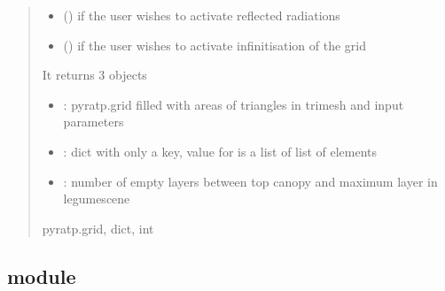\documentclass[letterpaper,10pt,english]{sphinxmanual}
\begin{document}
\begin{fulllineitems}
\begin{quote}
\begin{description}
\begin{itemize}
\item {} 
\sphinxAtStartPar
{} () \textendash{} if the user wishes to activate reflected radiations

\item {} 
\sphinxAtStartPar
{} () \textendash{} if the user wishes to activate infinitisation of the grid

\end{itemize}

\sphinxAtStartPar

\sphinxAtStartPar
It returns 3 objects
\begin{itemize}
\item {} 
\sphinxAtStartPar
{} : pyratp.grid filled with areas of triangles in trimesh and input parameters

\item {} 
\sphinxAtStartPar
{} : dict with only a  key, value for  is a list of  list of  elements

\item {} 
\sphinxAtStartPar
{} : number of empty layers between top canopy and maximum layer in legumescene

\end{itemize}


\sphinxAtStartPar
pyratp.grid, dict, int

\end{description}\end{quote}

\end{fulllineitems}



\subsection{ module}
\label{\detokenize{reference:module-defaultvalues}}\label{\detokenize{reference:defaultvalues-module}}
\end{document}
